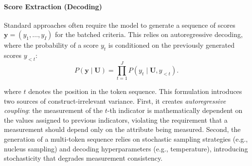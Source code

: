 


\paragraph{Score Extraction (Decoding)}
Standard approaches often require the model to generate a sequence of scores $\mathbf{y}=(y_1,\dots,y_I)$ for the batched criteria. This relies on autoregressive decoding, where the probability of a score $y_t$ is conditioned on the previously generated scores $y_{<t}$:
\begin{equation}
    P(\mathbf{y} \mid \mathbf{U}) = \prod_{t=1}^{J} P(y_t \mid \mathbf{U}, y_{<t}).
\end{equation}

where $t$ denotes the position in the token sequence. This formulation introduces two sources of construct-irrelevant variance. First, it creates \textit{autoregressive coupling}: the measurement of the $t$-th indicator is mathematically dependent on the values assigned to previous indicators, violating the requirement that a measurement should depend only on the attribute being measured. Second, the generation of a multi-token sequence relies on stochastic sampling strategies (e.g., nucleus sampling) and decoding hyperparameters (e.g., temperature), introducing stochasticity that degrades measurement consistency. 

